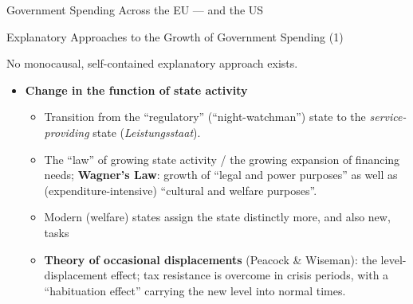\documentclass[11pt,aspectratio=169]{beamer}
\begin{document}
\begin{frame}{Government Spending Across the EU --- and the US}
  \begin{center}
  \end{center}

\end{frame}

\begin{frame}{Explanatory Approaches to the Growth of Government Spending (1)}
	
	No monocausal, self-contained explanatory approach exists.
	\vspace{0.4em}
	\begin{itemize}
		\item \textbf{Change in the function of state activity}
		\begin{itemize}
			\item Transition from the ``regulatory'' (``night-watchman'') state to the \emph{service-providing} state (\emph{Leistungsstaat}).
			\item The ``law'' of growing state activity / the growing expansion of financing needs; \textbf{Wagner's Law}: growth of ``legal and power purposes'' as well as (expenditure-intensive) ``cultural and welfare purposes''.
			\item Modern (welfare) states assign the state distinctly more, and also new, tasks 
			\item \textbf{Theory of occasional displacements} (Peacock \& Wiseman): the level-displacement effect; tax resistance is overcome in crisis periods, with a ``habituation effect'' carrying the new level into normal times.
		\end{itemize}
	\end{itemize}

\end{frame}
\end{document}
